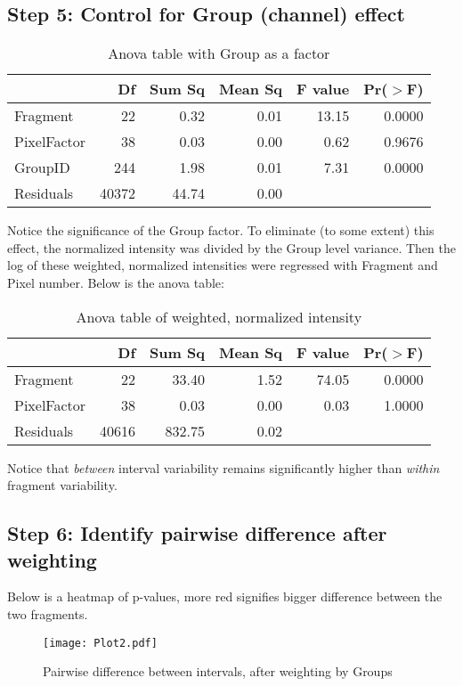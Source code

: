 \documentclass[14pt]{article}
\begin{document}
\subsection*{Step 5: Control for Group (channel) effect}
\begin{table}[H]
\centering
\begin{tabular}{lrrrrr}
  \hline
 & Df & Sum Sq & Mean Sq & F value & Pr($>$F) \\ 
  \hline
Fragment & 22 & 0.32 & 0.01 & 13.15 & 0.0000 \\ 
  PixelFactor & 38 & 0.03 & 0.00 & 0.62 & 0.9676 \\ 
  GroupID & 244 & 1.98 & 0.01 & 7.31 & 0.0000 \\ 
  Residuals & 40372 & 44.74 & 0.00 &  &  \\ 
   \hline
\end{tabular}
\caption{Anova table with Group as a factor}
\end{table}
Notice the significance of the Group factor. To eliminate (to some extent) this effect, the normalized intensity was divided by the Group level variance. Then the log of these weighted, normalized intensities were regressed with Fragment and Pixel number. Below is the anova table:\\
\begin{table}[H]
\centering
\begin{tabular}{lrrrrr}
  \hline
 & Df & Sum Sq & Mean Sq & F value & Pr($>$F) \\ 
  \hline
Fragment & 22 & 33.40 & 1.52 & 74.05 & 0.0000 \\ 
  PixelFactor & 38 & 0.03 & 0.00 & 0.03 & 1.0000 \\ 
  Residuals & 40616 & 832.75 & 0.02 &  &  \\ 
   \hline
\end{tabular}
\caption{Anova table of weighted, normalized intensity}
\end{table}

Notice that {\it{between}} interval variability remains significantly higher than {\it{within}} fragment variability.

\subsection*{Step 6: Identify pairwise difference after weighting}
Below is a heatmap of p-values, more red signifies bigger difference between the two fragments.
\begin{figure}[H]
\centering
\texttt{[image: Plot2.pdf]}
\caption{Pairwise difference between intervals, after weighting by Groups}

\end{figure}
\end{document}
